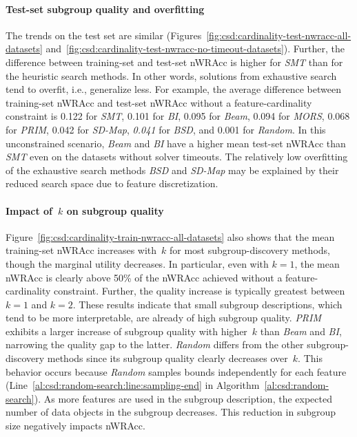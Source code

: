 \documentclass[acmsmall]{acmart} %
\theoremstyle{acmplain}
\theoremstyle{acmdefinition}
\begin{document}
\paragraph{Test-set subgroup quality and overfitting}

The trends on the test set are similar (Figures~\ref{fig:csd:cardinality-test-nwracc-all-datasets} and~\ref{fig:csd:cardinality-test-nwracc-no-timeout-datasets}). 
Further, the difference between training-set and test-set nWRAcc is higher for \emph{SMT} than for the heuristic search methods.
In other words, solutions from exhaustive search tend to overfit, i.e., generalize less.
For example, the average difference between training-set nWRAcc and test-set nWRAcc without a feature-cardinality constraint is 0.122 for \emph{SMT}, 0.101 for \emph{BI}, 0.095 for \emph{Beam}, 0.094 for \emph{MORS}, 0.068 for \emph{PRIM}, 0.042 for \emph{SD-Map}, \emph{0.041} for \emph{BSD}, and 0.001 for \emph{Random}.
In this unconstrained scenario, \emph{Beam} and \emph{BI} have a higher mean test-set nWRAcc than \emph{SMT} even on the datasets without solver timeouts.
The relatively low overfitting of the exhaustive search methods \emph{BSD} and \emph{SD-Map} may be explained by their reduced search space due to feature discretization.

\paragraph{Impact of~$k$ on subgroup quality}

Figure~\ref{fig:csd:cardinality-train-nwracc-all-datasets} also shows that the mean training-set nWRAcc increases with~$k$ for most subgroup-discovery methods, though the marginal utility decreases.
In particular, even with $k=1$, the mean nWRAcc is clearly above 50\% of the nWRAcc achieved without a feature-cardinality constraint.
Further, the quality increase is typically greatest between $k=1$ and $k=2$.
These results indicate that small subgroup descriptions, which tend to be more interpretable, are already of high subgroup quality.
\emph{PRIM} exhibits a larger increase of subgroup quality with higher~$k$ than \emph{Beam} and \emph{BI}, narrowing the quality gap to the latter.
\emph{Random} differs from the other subgroup-discovery methods since its subgroup quality clearly decreases over~$k$.
This behavior occurs because \emph{Random} samples bounds independently for each feature (Line~\ref{al:csd:random-search:line:sampling-end} in Algorithm~\ref{al:csd:random-search}).
As more features are used in the subgroup description, the expected number of data objects in the subgroup decreases. 
This reduction in subgroup size negatively impacts nWRAcc.
\end{document}
